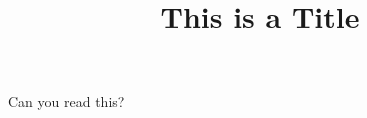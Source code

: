 \documentclass{ximera}
\title{This is a Title}
\begin{document}
\maketitle
Can you read this?
\end{document}
